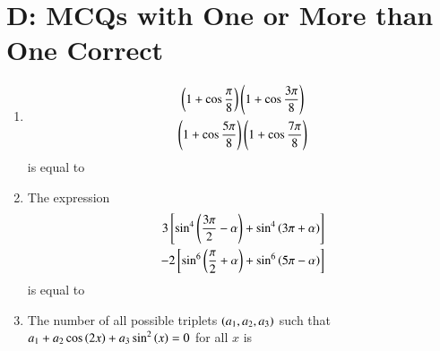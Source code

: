 \documentclass[journal,12pt,twocolumn,article]{IEEEtran}
\theoremstyle{remark}
\begin{document}
\section*{D: MCQs with One or More than One Correct}
\begin{enumerate}
\item 
\begin{multline*}
\left(1 + \cos\frac{\pi}{8}\right)\left(1 + \cos\frac{3\pi}{8}\right)\\
\left(1 + \cos\frac{5\pi}{8}\right)\left(1 + \cos\frac{7\pi}{8}\right) 
\end{multline*}
is equal to
\hfill{}
\begin{enumerate}
\end{enumerate}
\item The expression 
\begin{align*}
3{}\left[\sin^4\left(\frac{3\pi}{2} - \alpha\right) + \sin^4\left(3\pi + \alpha\right)\right]  \\ - 2{}\left[\sin^6\left(\frac{\pi}{2} + \alpha\right) + \sin^6\left(5\pi - \alpha\right)\right]
\end{align*}
is equal to
\hfill{}
\begin{enumerate}
\end{enumerate}
\item The number of all possible triplets $\left(a_1, a_2, a_3\right)$ such that $a_1 + a_2 \cos\left(2x\right) + a_3\sin^2\left(x\right) = 0$ for all $x$ is

\end{enumerate}
\end{document}
